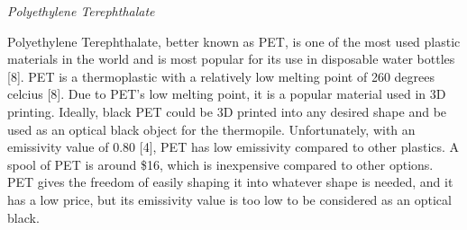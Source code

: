 \documentclass[10pt,draftclsnofoot,onecolumn,letterpaper]{article}
\begin{document}
    {\fontsize{10pt}{12.0pt}\textit{Polyethylene Terephthalate}\\\selectfont 
    \par}\par
    {\fontsize{10pt}{12.0pt}Polyethylene Terephthalate, better known as PET, is one of the most used plastic materials in the world and is most popular for its use in disposable water bottles [8]. PET is a thermoplastic with a relatively low melting point of 260 degrees celcius [8]. Due to PET's low melting point, it is a popular material used in 3D printing. Ideally, black PET could be 3D printed into any desired shape and be used as an optical black object for the thermopile. Unfortunately, with an emissivity value of 0.80 [4], PET has low emissivity compared to other plastics. A spool of PET is around \$16, which is inexpensive compared to other options. PET gives the freedom of easily shaping it into whatever shape is needed, and it has a low price, but its emissivity value is too low to be considered as an optical black.\\\selectfont 
    \par}\par
    
\end{document}
